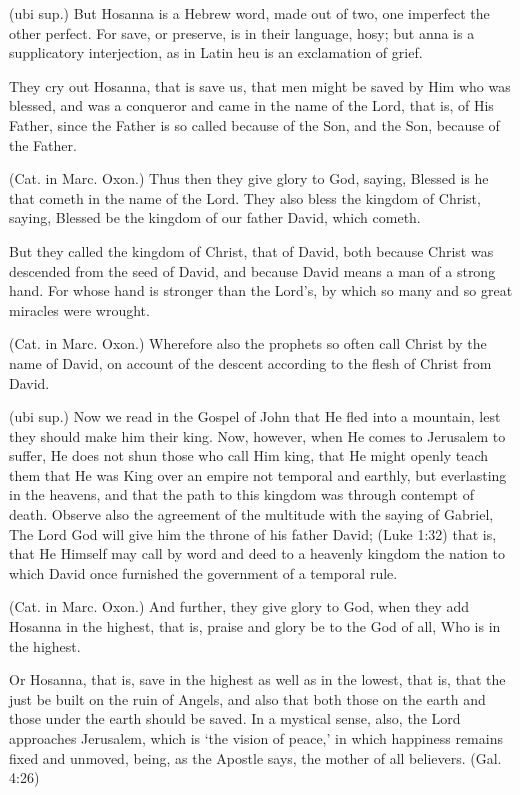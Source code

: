  (ubi sup.) But Hosanna is a Hebrew word, made out of two, one imperfect the other perfect. For save, or preserve, is in their language, hosy; but anna is a supplicatory interjection, as in Latin heu is an exclamation of grief.

 They cry out Hosanna, that is save us, that men might be saved by Him who was blessed, and was a conqueror and came in the name of the Lord, that is, of His Father, since the Father is so called because of the Son, and the Son, because of the Father.

 (Cat. in Marc. Oxon.) Thus then they give glory to God, saying, Blessed is he that cometh in the name of the Lord. They also bless the kingdom of Christ, saying, Blessed be the kingdom of our father David, which cometh.

 But they called the kingdom of Christ, that of David, both because Christ was descended from the seed of David, and because David means a man of a strong hand. For whose hand is stronger than the Lord’s, by which so many and so great miracles were wrought.

 (Cat. in Marc. Oxon.) Wherefore also the prophets so often call Christ by the name of David, on account of the descent according to the flesh of Christ from David.

 (ubi sup.) Now we read in the Gospel of John that He fled into a mountain, lest they should make him their king. Now, however, when He comes to Jerusalem to suffer, He does not shun those who call Him king, that He might openly teach them that He was King over an empire not temporal and earthly, but everlasting in the heavens, and that the path to this kingdom was through contempt of death. Observe also the agreement of the multitude with the saying of Gabriel, The Lord God will give him the throne of his father David; (Luke 1:32) that is, that He Himself may call by word and deed to a heavenly kingdom the nation to which David once furnished the government of a temporal rule.

 (Cat. in Marc. Oxon.) And further, they give glory to God, when they add Hosanna in the highest, that is, praise and glory be to the God of all, Who is in the highest.

 Or Hosanna, that is, save in the highest as well as in the lowest, that is, that the just be built on the ruin of Angels, and also that both those on the earth and those under the earth should be saved. In a mystical sense, also, the Lord approaches Jerusalem, which is ‘the vision of peace,’ in which happiness remains fixed and unmoved, being, as the Apostle says, the mother of all believers. (Gal. 4:26)

